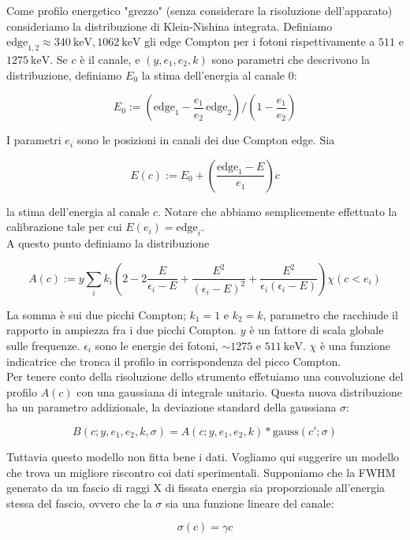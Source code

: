 \documentclass[a4paper,11pt,italian]{report}
\begin{document}
Come profilo energetico "grezzo" (senza considerare la risoluzione dell'apparato) consideriamo la distribuzione di Klein-Nishina integrata. Definiamo $\text{edge}_{1,2} \approx \SI{340}{\kilo\electronvolt}, \SI{1062}{\kilo\electronvolt}$ gli edge Compton per i fotoni rispettivamente a $511$ e $\SI{1275}{\kilo\electronvolt}$. Se $c$ è il canale, e $(y,e_1,e_2,k)$ sono parametri che descrivono la distribuzione, definiamo $E_0$ la stima dell'energia al canale $0$:

\[E_0 := \left(\text{edge}_1 - \frac{e_1}{e_2} \, \text{edge}_2\right)/\left(1-\frac{e_1}{e_2}\right) \]

I parametri $e_i$ sono le posizioni in canali dei due Compton edge. Sia

\[E(c) := E_0 + \left(\frac{\text{edge}_1 - E}{e_1}\right) c\]

la stima dell'energia al canale $c$. Notare che abbiamo semplicemente effettuato la calibrazione tale per cui $E(e_i) = \text{edge}_i$.\\

A questo punto definiamo la distribuzione

\[ A(c) := y \sum_i k_i \left( 2-2 \frac {E} {\epsilon_i - E} + \frac{E^2}{(\epsilon_i-E)^2} + \frac{E^2}{\epsilon_i (\epsilon_i-E)} \right) \chi(c<e_i) \]

La somma è sui due picchi Compton; $k_1 = 1$ e $k_2 = k$, parametro che racchiude il rapporto in ampiezza fra i due picchi Compton. $y$ è un fattore di scala globale sulle frequenze. $\epsilon_i$ sono le energie dei fotoni, $\sim 1275$ e $\SI{511}{\kilo\electronvolt}$. $\chi$ è una funzione indicatrice che tronca il profilo in corrispondenza del picco Compton.\\

Per tenere conto della risoluzione dello strumento effetuiamo una convoluzione del profilo $A(c)$ con una gaussiana di integrale unitario. Questa nuova distribuzione ha un parametro addizionale, la deviazione standard della gaussiana $\sigma$:

\[ B(c;y,e_1,e_2,k,\sigma) = A(c;y,e_1,e_2,k) * \text{gauss}(c';\sigma) \]

Tuttavia questo modello non fitta bene i dati. Vogliamo qui suggerire un modello che trova un migliore riscontro coi dati sperimentali. Supponiamo che la FWHM generato da un fascio di raggi X di fissata energia sia proporzionale all'energia stessa del fascio, ovvero che la $\sigma$ sia una funzione lineare del canale:

\[ \sigma(c) = \gamma c \]
\end{document}
